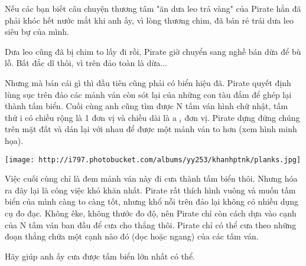 Nếu các bạn biết câu chuyện thương tâm "ăn dưa leo trả vàng" của Pirate hẳn đã phải khóc hết nước mắt khi anh ấy, vì lòng thương chim, đã bán rẻ trái dưa leo siêu bự của mình.  

   Dưa leo cũng đã bị chim to lấy đi rồi, Pirate giờ chuyển sang nghề bán dừa để bù lỗ. Bất đắc dĩ thôi, vì trên đảo toàn là dừa...  

   Nhưng mà bán cái gì thì đầu tiên cũng phải có biển hiệu đã. Pirate quyết định lùng sục trên đảo các mảnh ván còn sót lại của những con tàu đắm để ghép lại thành tấm biển. Cuối cùng anh cũng tìm được N tấm ván hình chữ nhật, tấm thứ i có chiều rộng là 1 đơn vị và chiều dài là a   $_    i   $   đơn vị. Pirate dựng đứng chúng trên mặt đất và dán lại với nhau để được một mảnh ván to hơn (xem hình minh họa).  


\texttt{[image: http://i797.photobucket.com/albums/yy253/khanhptnk/planks.jpg]}

   Việc cuối cùng chỉ là đem mảnh ván này đi cưa thành tấm biển thôi. Nhưng hóa ra đây lại là công việc khó khăn nhất. Pirate rất thích hình vuông và muốn tấm biển của mình càng to càng tốt, nhưng khổ nỗi trên đảo lại không có nhiều dụng cụ đo đạc. Không êke, không thước đo độ, nên Pirate chỉ còn cách dựa vào cạnh của N tấm ván ban đầu để cưa cho thẳng thôi. Pirate chỉ có thể cưa theo những đoạn thẳng chứa một cạnh nào đó (dọc hoặc ngang) của các tấm ván.  

   Hãy giúp anh ấy cưa được tấm biển lớn nhất có thể.